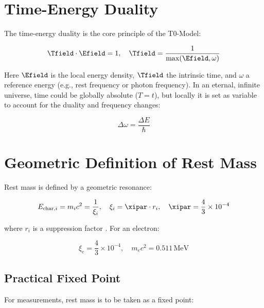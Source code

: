 \section{Time-Energy Duality}
\label{sec:time_energy_duality}

The time-energy duality is the core principle of the T0-Model:

\begin{equation}
	\Tfield \cdot \Efield = 1, \quad \Tfield = \frac{1}{\max(\Efield, \omega)}
	\label{eq:time_energy_duality}
\end{equation}

Here \(\Efield\) is the local energy density, \(\Tfield\) the intrinsic time, and \(\omega\) a reference energy (e.g., rest frequency or photon frequency). In an eternal, infinite universe, time could be globally absolute (\( T = t \)), but locally it is set as variable to account for the duality and frequency changes:

\begin{equation}
	\Delta \omega = \frac{\Delta E}{\hbar}
	\label{eq:frequency_change}
\end{equation}

\section{Geometric Definition of Rest Mass}
\label{sec:geometric_rest_mass}

Rest mass is defined by a geometric resonance:

\begin{equation}
	E_{\text{char},i} = m_i c^2 = \frac{1}{\xi_i}, \quad \xi_i = \xipar \cdot r_i, \quad \xipar = \frac{4}{3} \times 10^{-4}
	\label{eq:rest_mass_definition}
\end{equation}

where \(r_i\) is a suppression factor \cite{pascher_t0_energy_2025}. For an electron:

\begin{equation}
	\xi_e = \frac{4}{3} \times 10^{-4}, \quad m_e c^2 = 0.511 \, \text{MeV}
	\label{eq:electron_energy}
\end{equation}

\subsection{Practical Fixed Point}
\label{subsec:practical_fixed_point}

For measurements, rest mass is to be taken as a fixed point:

